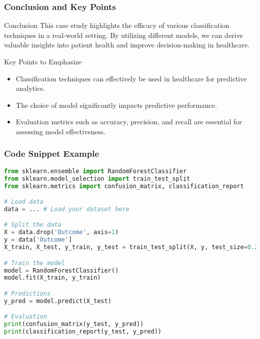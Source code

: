 \documentclass[aspectratio=169]{beamer}
\begin{document}
\begin{frame}[fragile]
    \frametitle{Conclusion and Key Points}
    \begin{block}{Conclusion}
        This case study highlights the efficacy of various classification techniques in a real-world setting. By utilizing different models, we can derive valuable insights into patient health and improve decision-making in healthcare.
    \end{block}
    
    \begin{block}{Key Points to Emphasize}
        \begin{itemize}
            \item Classification techniques can effectively be used in healthcare for predictive analytics.
            \item The choice of model significantly impacts predictive performance.
            \item Evaluation metrics such as accuracy, precision, and recall are essential for assessing model effectiveness.
        \end{itemize}
    \end{block}
\end{frame}

\begin{frame}[fragile]
    \frametitle{Code Snippet Example}
    \begin{lstlisting}[language=Python]
from sklearn.ensemble import RandomForestClassifier
from sklearn.model_selection import train_test_split
from sklearn.metrics import confusion_matrix, classification_report

# Load data
data = ... # Load your dataset here

# Split the data
X = data.drop('Outcome', axis=1)
y = data['Outcome']
X_train, X_test, y_train, y_test = train_test_split(X, y, test_size=0.2, random_state=42)

# Train the model
model = RandomForestClassifier()
model.fit(X_train, y_train)

# Predictions
y_pred = model.predict(X_test)

# Evaluation
print(confusion_matrix(y_test, y_pred))
print(classification_report(y_test, y_pred))
    \end{lstlisting}
\end{frame}
\end{document}
